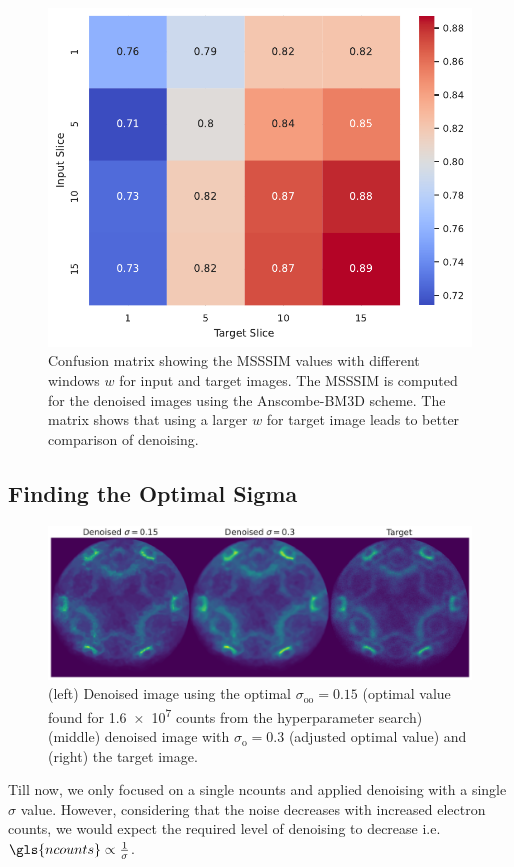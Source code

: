 \begin{figure}
    \centering
    \includegraphics[width=0.5\linewidth]{images/confusion_matrix_msssim_window_avg.pdf}
    \caption{Confusion matrix showing the \gls{MSSSIM} values with different windows $w$ for input and target images. The \gls{MSSSIM} is computed for the denoised images using the Anscombe-BM3D scheme. The matrix shows that using a larger $w$ for target image leads to better comparison of denoising.}
    \label{fig:confusion_matrix_msssim_window_avg}
\end{figure}

\subsection{Finding the Optimal Sigma}
\begin{figure}
    \centering
    \includegraphics[width=1\linewidth]{images/denoised_optimal_sigma.pdf}
    \caption{(left) Denoised image using the optimal $\sigma_{\text{oo}}=0.15$ (optimal value found for \num{1.6e7} counts from the hyperparameter search) (middle) denoised image with $\sigma_{\text{o}}=0.3$ (adjusted optimal value) and (right) the target image.}
    \label{fig:denoised-optimal-sigma}
\end{figure}
Till now, we only focused on a single \gls{ncounts} and applied denoising with a single $\sigma$ value. However, considering that the noise decreases with increased electron counts, we would expect the required level of denoising to decrease i.e. $\gls{ncounts}\propto\frac{1}{\sigma}$.

